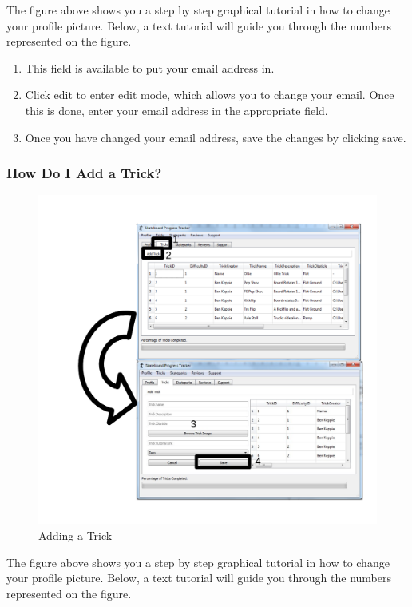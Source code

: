 The figure above shows you a step by step graphical tutorial in how to change your profile picture. Below, a text tutorial will guide you through the numbers represented on the figure.

\begin{enumerate}
\item This field is available to put your email address in.
\item Click edit to enter edit mode, which allows you to change your email. Once this is done, enter your email address in the appropriate field.
\item Once you have changed your email address, save the changes by clicking save.
\end{enumerate}

\subsubsection{How Do I Add a Trick?}

\begin{figure}[H]
    \includegraphics[width=\textwidth]{./Manual/Images/AddTrick.pdf}
    \caption{Adding a Trick} \label{fig:Add Trick}
\end{figure}

The figure above shows you a step by step graphical tutorial in how to change your profile picture. Below, a text tutorial will guide you through the numbers represented on the figure.

